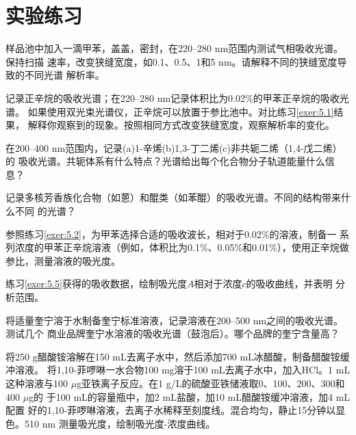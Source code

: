 \newpage
\section{实验练习}
\begin{exercise}\label{exer:5.1}
样品池中加入一滴甲苯，盖盖，密封，在220--280 nm范围内测试气相吸收光谱。保持扫描
速率，改变狭缝宽度，如0.1、0.5、1和5 nm。请解释不同的狭缝宽度导致的不同光谱
解析率。
\end{exercise}
\begin{exercise}\label{exer:5.2}
记录正辛烷的吸收光谱；在220--280 nm记录体积比为0.02\%的甲苯正辛烷的吸收光谱。
如果使用双光束光谱仪，正辛烷可以放置于参比池中。对比练习\ref{exer:5.1}结果，
解释你观察到的现象。按照相同方式改变狭缝宽度，观察解析率的变化。
\end{exercise}
\begin{exercise}\label{exer:5.3}
在200--400 nm范围内，记录(a)1-辛烯(b)1,3-丁二烯(c)非共轭二烯（1,4-戊二烯）的
吸收光谱。共轭体系有什么特点？光谱给出每个化合物分子轨道能量什么信息？
\end{exercise}
\begin{exercise}\label{exer:5.4}
记录多核芳香族化合物（如蒽）和醌类（如苯醌）的吸收光谱。不同的结构带来什么不同
的光谱？
\end{exercise}
\begin{exercise}\label{exer:5.5}
参照练习\ref{exer:5.2}，为甲苯选择合适的吸收波长，相对于0.02\%的溶液，制备一
系列浓度的甲苯正辛烷溶液（例如，体积比为0.1\%、0.05\%和0.01\%），使用正辛烷做
参比，测量溶液的吸光度。
\end{exercise}
\begin{exercise}\label{exer:5.6}
练习\ref{exer:5.5}获得的吸收数据，绘制吸光度$A$相对于浓度$c$的吸收曲线，并表明
分析范围。
\end{exercise}
\begin{exercise}\label{exer:5.7}
将适量奎宁溶于水制备奎宁标准溶液，记录溶液在200--500 nm之间的吸收光谱。测试几个
商业品牌奎宁水溶液的吸收光谱（鼓泡后）。哪个品牌的奎宁含量高？
\end{exercise}
\begin{exercise}\label{exer:5.8}
将250 g醋酸铵溶解在150 mL去离子水中，然后添加700 mL冰醋酸，制备醋酸铵缓冲溶液。
将1,10-菲啰啉一水合物100 mg溶于100 mL去离子水中，加入HCl。1 mL这种溶液与100
$\mu$g亚铁离子反应。在1 g/L的硫酸亚铁储液取0、100、200、300和400 $\mu$g的
于100 mL的容量瓶中，加2 mL盐酸，加10 mL醋酸铵缓冲溶液，加4 mL配置
好的1,10-菲啰啉溶液，去离子水稀释至刻度线。混合均匀，静止15分钟以显色。510 nm
测量吸光度，绘制吸光度-浓度曲线。
\end{exercise}
